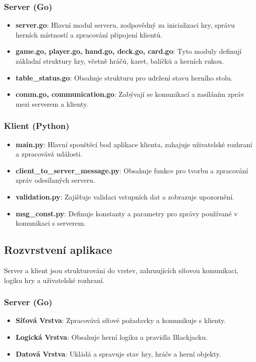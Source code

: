 \documentclass{article}
\begin{document}
\subsubsection{Server (Go)}
\begin{itemize}
  \item \textbf{server.go}: Hlavní modul serveru, zodpovědný za inicializaci hry, správu herních místností a zpracování připojení klientů.
  \item \textbf{game.go, player.go, hand.go, deck.go, card.go}: Tyto moduly definují základní struktury hry, včetně hráčů, karet, balíčků a herních rukou.
  \item \textbf{table\_status.go}: Obsahuje strukturu pro udržení stavu herního stolu.
  \item \textbf{comm.go, communication.go}: Zabývají se komunikací a zasíláním zpráv mezi serverem a klienty.
\end{itemize}

\subsubsection{Klient (Python)}
\begin{itemize}
  \item \textbf{main.py}: Hlavní spouštěcí bod aplikace klienta, zahajuje uživatelské rozhraní a zpracovává události.
  \item \textbf{client\_to\_server\_message.py}: Obsahuje funkce pro tvorbu a zpracování zpráv odesílaných serveru.
  \item \textbf{validation.py}: Zajišťuje validaci vstupních dat a zobrazuje upozornění.
  \item \textbf{msg\_const.py}: Definuje konstanty a parametry pro zprávy používané v komunikaci s serverem.
\end{itemize}

\subsection{Rozvrstvení aplikace}
Server a klient jsou strukturováni do vrstev, zahrnujících síťovou komunikaci, logiku hry a uživatelské rozhraní.

\subsubsection{Server (Go)}
\begin{itemize}
  \item \textbf{Síťová Vrstva}: Zpracovává síťové požadavky a komunikuje s klienty.
  \item \textbf{Logická Vrstva}: Obsahuje herní logiku a pravidla Blackjacku.
  \item \textbf{Datová Vrstva}: Ukládá a spravuje stav hry, hráče a herní objekty.
\end{itemize}
\end{document}
